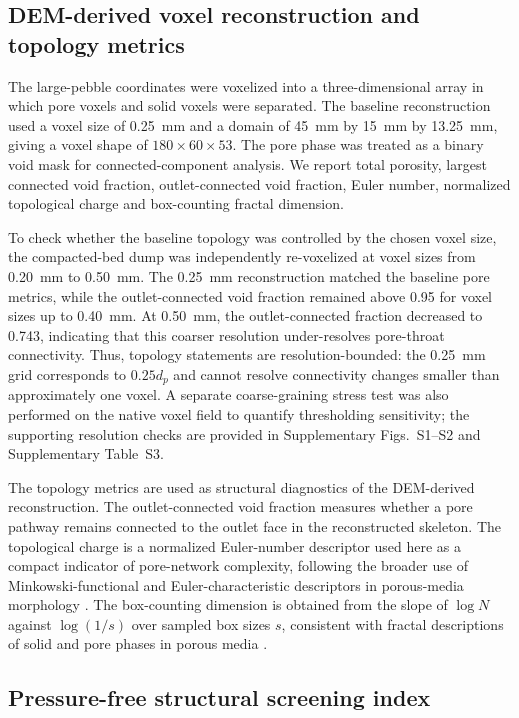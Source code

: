 \documentclass[preprint,12pt,authoryear]{elsarticle}
\begin{document}
\subsection{DEM-derived voxel reconstruction and topology metrics}

The large-pebble coordinates were voxelized into a three-dimensional array in which pore voxels and solid voxels were separated. The baseline reconstruction used a voxel size of \SI{0.25}{mm} and a domain of \SI{45}{mm} by \SI{15}{mm} by \SI{13.25}{mm}, giving a voxel shape of $180 \times 60 \times 53$. The pore phase was treated as a binary void mask for connected-component analysis. We report total porosity, largest connected void fraction, outlet-connected void fraction, Euler number, normalized topological charge and box-counting fractal dimension.

To check whether the baseline topology was controlled by the chosen voxel size, the compacted-bed dump was independently re-voxelized at voxel sizes from \SI{0.20}{mm} to \SI{0.50}{mm}. The \SI{0.25}{mm} reconstruction matched the baseline pore metrics, while the outlet-connected void fraction remained above 0.95 for voxel sizes up to \SI{0.40}{mm}. At \SI{0.50}{mm}, the outlet-connected fraction decreased to 0.743, indicating that this coarser resolution under-resolves pore-throat connectivity. Thus, topology statements are resolution-bounded: the \SI{0.25}{mm} grid corresponds to $0.25d_p$ and cannot resolve connectivity changes smaller than approximately one voxel. A separate coarse-graining stress test was also performed on the native voxel field to quantify thresholding sensitivity; the supporting resolution checks are provided in Supplementary Figs.~S1--S2 and Supplementary Table~S3.

The topology metrics are used as structural diagnostics of the DEM-derived reconstruction. The outlet-connected void fraction measures whether a pore pathway remains connected to the outlet face in the reconstructed skeleton. The topological charge is a normalized Euler-number descriptor used here as a compact indicator of pore-network complexity, following the broader use of Minkowski-functional and Euler-characteristic descriptors in porous-media morphology \citep{Armstrong2019Minkowski}. The box-counting dimension is obtained from the slope of $\log N$ against $\log(1/s)$ over sampled box sizes $s$, consistent with fractal descriptions of solid and pore phases in porous media \citep{Dathe2005Fractal}.

\subsection{Pressure-free structural screening index}
\end{document}

